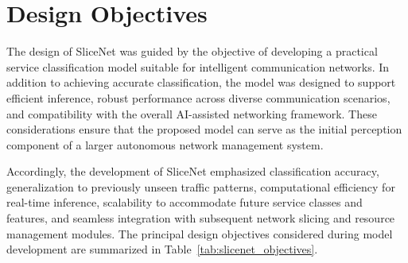 \documentclass[12pt,a4paper]{report}
\begin{document}

	
	\section{Design Objectives}
	\label{sec:design_objectives}
	
	The design of SliceNet was guided by the objective of developing a practical service classification model suitable for intelligent communication networks. In addition to achieving accurate classification, the model was designed to support efficient inference, robust performance across diverse communication scenarios, and compatibility with the overall AI-assisted networking framework. These considerations ensure that the proposed model can serve as the initial perception component of a larger autonomous network management system.
	
	Accordingly, the development of SliceNet emphasized classification accuracy, generalization to previously unseen traffic patterns, computational efficiency for real-time inference, scalability to accommodate future service classes and features, and seamless integration with subsequent network slicing and resource management modules. The principal design objectives considered during model development are summarized in Table~\ref{tab:slicenet_objectives}.
	
\end{document}
